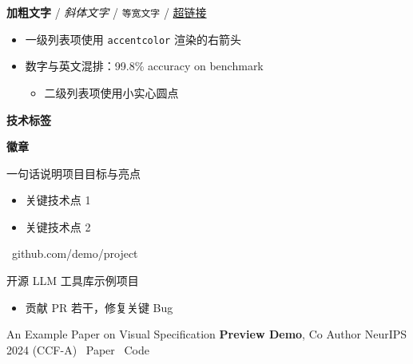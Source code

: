 \documentclass[zh]{resume-pro}
\begin{document}
\makeheader

\begin{abstract}
本文档展示 resume-pro 在当前主题下的所有核心视觉组件：标题、列表、技能进度条、技能标签、徽章、项目卡片、开源条目、论文条目、奖项条目等。
\end{abstract}


\textbf{加粗文字} / \textit{斜体文字} / \texttt{等宽文字} / \href{https://example.com}{超链接}

\begin{itemize}
  \item 一级列表项使用 \texttt{accentcolor} 渲染的右箭头
  \item 数字与英文混排：99.8\% accuracy on benchmark
  \begin{itemize}
    \item 二级列表项使用小实心圆点
  \end{itemize}
\end{itemize}



\vspace{0.4em}
\textbf{技术标签} \quad
{}    

\vspace{0.3em}
\textbf{徽章} \quad
{}  


{一句话说明项目目标与亮点}
{%
\begin{itemize}
  \item 关键技术点 1
  \item 关键技术点 2
\end{itemize}
}
{\faGithub\ github.com/demo/project}

{开源 LLM 工具库示例项目}
{%
\begin{itemize}
  \item 贡献 PR 若干，修复关键 Bug
\end{itemize}
}


\publicationItem
{An Example Paper on Visual Specification}
{\textbf{Preview Demo}, Co Author}
{NeurIPS 2024 (CCF-A)}
{\faFilePdf\ Paper \quad \faGithub\ Code}

\end{document}
